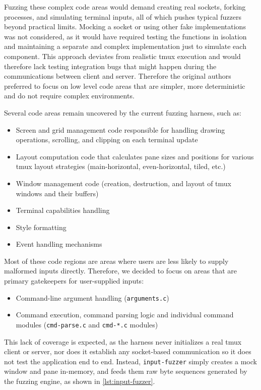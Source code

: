 \documentclass[11pt,a4paper,twocolumn]{article}
\begin{document}
Fuzzing these complex code areas would demand creating real sockets, forking processes, and simulating terminal inputs, all of which pushes typical fuzzers beyond practical limits. Mocking a socket or using other fake implementations was not considered, as it would have required testing the functions in isolation and maintaining a separate and complex implementation just to simulate each component. This approach deviates from realistic tmux execution and would therefore lack testing integration bugs that might happen during the communications between client and server. Therefore the original authors preferred to focus on low level code areas that are simpler, more deterministic and do not require complex environments.

Several code areas remain uncovered by the current fuzzing harness, such as:
\begin{itemize}
    \item Screen and grid management code responsible for handling drawing operations, scrolling, and clipping on each terminal update
    \item Layout computation code that calculates pane sizes and positions for various tmux layout strategies (main-horizontal, even-horizontal, tiled, etc.)
    \item Window management code (creation, destruction, and layout of tmux windows and their buffers)
    \item Terminal capabilities handling
    \item Style formatting
    \item Event handling mechanisms
\end{itemize}

Most of these code regions are areas where users are less likely to supply malformed inputs directly. Therefore, we decided to focus on areas that are primary gatekeepers for user-supplied inputs:

\begin{itemize}
    \item Command-line argument handling (\texttt{arguments.c})
	\item Command execution, command parsing logic and individual command modules (\texttt{cmd-parse.c} and \texttt{cmd-*.c} modules)
\end{itemize}

This lack of coverage is expected, as the harness never initializes a real tmux client or server, nor does it establish any socket-based communication so it does not test the application end to end. Instead, \texttt{input-fuzzer} simply creates a mock window and pane in-memory, and feeds them raw byte sequences generated by the fuzzing engine, as shown in \autoref{lst:input-fuzzer}.
\end{document}
